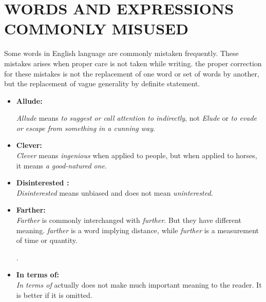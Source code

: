 \documentclass{report}
\begin{document}
    
    \chapter{WORDS AND EXPRESSIONS COMMONLY MISUSED}
    
    Some words in English language are commonly mistaken frequently. These mistakes arises when proper care is not taken while writing. the proper correction for these mistakes is not the replacement of one word or set of words by another, but the replacement of vague generality by definite statement.
    \bigskip
    
    \begin{itemize}
        \item
        \textbf{\Large{Allude:}}
        
        \textit{Allude} means \textit{to suggest or call attention to indirectly}, not \textit{Elude} or \textit{to evade or escape from something in a cunning way}.
    
        \bigskip
        
        \item
        \textbf{\Large{Clever:}}\\
        \textit{Clever} means \textit{ingenious} when applied to people, but when applied to horses, it means \textit{a good-natured one}.
        
        \bigskip
    
        \item
        \textbf{\Large{Disinterested :}}\\
        \textit{Disinterested} means unbiased and does not mean \textit{uninterested}.
        
    
        \newpage
        
        \item
        \textbf{\Large{Farther:}}\\
        
        \textit{Farther} is commonly interchanged with \textit{further}. But they have different meaning. \textit{farther} is a word implying distance, while \textit{further} is a measurement of time or quantity.
        
            .
        \item
        \textbf{\Large{In terms of:}}\\
        
        \textit{In terms of} actually does not make much important meaning to the reader. It is better if it is omitted.
        \bigskip
    

\end{itemize}
\end{document}
